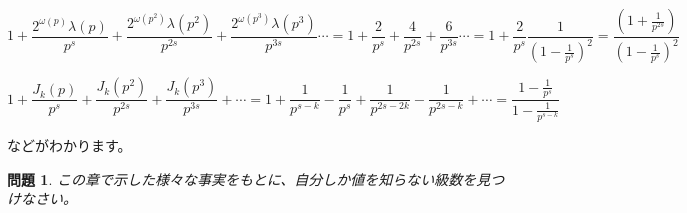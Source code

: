 \documentclass[a4paper]{jsarticle}
\theoremstyle{break}
\newtheorem*{prb}{問題}
\begin{document}
\[1+\frac{2^{\omega(p)}\lambda(p)}{p^s}+\frac{2^{\omega(p^2)}\lambda(p^2)}{p^{2s}}+\frac{2^{\omega(p^3)}\lambda(p^3)}{p^{3s}}\cdots=1+\frac{2}{p^s}+\frac{4}{p^{2s}}+\frac{6}{p^{3s}}\cdots=1+\frac{2}{p^s}\frac{1}{\left( 1-\frac{1}{p^s} \right)^2}=\frac{\left( 1+\frac{1}{p^{2s}} \right)}{\left( 1-\frac{1}{p^s} \right)^2}\]

\[1+\frac{J_k(p)}{p^s}+\frac{J_k(p^2)}{p^{2s}}+\frac{J_k(p^3)}{p^{3s}}+\cdots=1+\frac{1}{p^{s-k}}-\frac{1}{p^s}+\frac{1}{p^{2s-2k}}-\frac{1}{p^{2s-k}}+\cdots=\frac{1-\frac{1}{p^s}}{1-\frac{1}{p^{s-k}}}\]

などがわかります。

\begin{prb}
この章で示した様々な事実をもとに、自分しか値を知らない級数を見つけなさい。
\end{prb}
\end{document}
